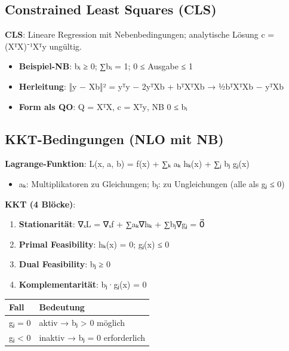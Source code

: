 \documentclass[11pt, a4paper]{article}
\begin{document}
\subsection{Constrained Least Squares (CLS)}

\textbf{CLS}: Lineare Regression mit Nebenbedingungen; analytische Lösung c⃗ = (XᵀX)⁻¹Xᵀy⃗ ungültig.


\begin{itemize}
  \item \textbf{Beispiel-NB}: bᵢ ≥ 0; ∑bᵢ = 1; 0 ≤ Ausgabe ≤ 1
  \item \textbf{Herleitung}: ‖y⃗ − Xb⃗‖² = y⃗ᵀy⃗ − 2y⃗ᵀXb⃗ + b⃗ᵀXᵀXb⃗ → ½b⃗ᵀXᵀXb⃗ − y⃗ᵀXb⃗
  \item \textbf{Form als QO}: Q = XᵀX, c⃗ = Xᵀy⃗, NB 0 ≤ bᵢ
\end{itemize}


\subsection{KKT-Bedingungen (NLO mit NB)}

\textbf{Lagrange-Funktion}: L(x⃗, a, b) = f(x⃗) + ∑ₖ aₖ hₖ(x⃗) + ∑ⱼ bⱼ gⱼ(x⃗)

\begin{itemize}
  \item aₖ: Multiplikatoren zu Gleichungen; bⱼ: zu Ungleichungen (alle als gⱼ ≤ 0)
\end{itemize}

\textbf{KKT (4 Blöcke)}:

\begin{enumerate}
  \item \textbf{Stationarität}: ∇ₓL = ∇ₓf + ∑aₖ∇hₖ + ∑bⱼ∇gⱼ = 0⃗
  \item \textbf{Primal Feasibility}: hₖ(x⃗) = 0; gⱼ(x⃗) ≤ 0
  \item \textbf{Dual Feasibility}: bⱼ ≥ 0
  \item \textbf{Komplementarität}: bⱼ·gⱼ(x⃗) = 0
\end{enumerate}


{\small
\begin{tabularx}{\linewidth}{XX}
\hline
\rowcolor{tableheadbg}
{\color{white}\textbf{Fall}} & {\color{white}\textbf{Bedeutung}} \\[2pt]
\hline
\endhead
\hline
\endfoot
gⱼ = 0 & aktiv → bⱼ > 0 möglich \\
gⱼ < 0 & inaktiv → bⱼ = 0 erforderlich \\
\end{tabularx}
}
\end{document}
